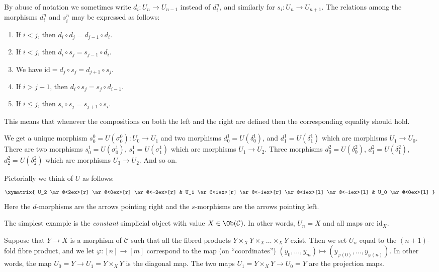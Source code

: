 \begin{remark}
\label{remark-relations}
By abuse of notation we sometimes write $d_i : U_n \to U_{n - 1}$
instead of $d^n_i$, and similarly for $s_i : U_n \to U_{n + 1}$.
The relations among the morphisms $d^n_i$ and $s^n_i$
may be expressed as follows:
\begin{enumerate}
\item If $i < j$, then $d_i \circ d_j = d_{j - 1} \circ d_i$.
\item If $i < j$, then $d_i \circ s_j = s_{j - 1} \circ d_i$.
\item We have $\text{id} = d_j \circ s_j = d_{j + 1} \circ s_j$.
\item If $i > j + 1$, then $d_i \circ s_j = s_j \circ d_{i - 1}$.
\item If $i \leq j$, then $s_i \circ s_j = s_{j + 1} \circ s_i$.
\end{enumerate}
This means that whenever the compositions on both the left and the
right are defined then the corresponding equality should hold.
\end{remark}

\noindent
We get a unique morphism $s^0_0 = U(\sigma^0_0) : U_0 \to U_1$ and
two morphisms $d^1_0 = U(\delta^1_0)$, and
$d^1_1 = U(\delta^1_1)$ which are morphisms $U_1 \to U_0$.
There are two morphisms $s^1_0 = U(\sigma^1_0)$, $s^1_1 = U(\sigma^1_1)$
which are morphisms $U_1 \to U_2$. Three morphisms
$d^2_0 = U(\delta^2_0)$, $d^2_1 = U(\delta^2_1)$, $d^2_2 = U(\delta^2_2)$
which are morphisms $U_3 \to U_2$. And so on.

\medskip\noindent
Pictorially we think of $U$ as follows:
$$
\xymatrix{
U_2
\ar@<2ex>[r]
\ar@<0ex>[r]
\ar@<-2ex>[r]
&
U_1
\ar@<1ex>[r]
\ar@<-1ex>[r]
\ar@<1ex>[l]
\ar@<-1ex>[l]
&
U_0
\ar@<0ex>[l]
}
$$
Here the $d$-morphisms are the arrows pointing right and the
$s$-morphisms are the arrows pointing left.

\begin{example}
\label{example-constant-simplicial-object}
The simplest example is the {\it constant} simplicial object with
value $X \in \Ob(\mathcal{C})$. In other words, $U_n = X$ and
all maps are $\text{id}_X$.
\end{example}

\begin{example}
\label{example-fibre-products-simplicial-object}
Suppose that $Y\to X$ is a morphism of $\mathcal{C}$ such that all
the fibred products $Y \times_X Y \times_X \ldots \times_X Y$ exist.
Then we set $U_n$ equal to the $(n + 1)$-fold fibre product,
and we let $\varphi : [n] \to [m]$ correspond to the map
(on ``coordinates'')
$(y_0, \ldots, y_m) \mapsto (y_{\varphi(0)}, \ldots, y_{\varphi(n)})$.
In other words, the map $U_0 = Y \to U_1 = Y \times_X Y$ is the
diagonal map. The two maps $U_1 = Y \times_X Y \to U_0 = Y$ are the
projection maps.
\end{example}

